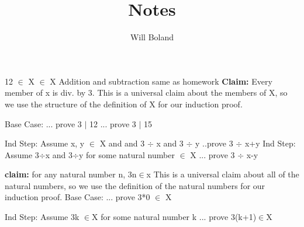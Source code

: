 \documentclass{article}
\begin{document}
\title{Notes}
\author{Will Boland}
\maketitle

12 $\in$ X $\in$ X\newline\newline
Addition and subtraction same as homework\newline\newline
\textbf{Claim:} Every member of x is div. by 3.\newline
This is a universal claim about the members of X, so we use the structure of the definition of X for our induction proof.\newline\newline

Base Case:\newline
... prove 3 $\mid$ 12\newline
... prove 3 $\mid$ 15\newline\newline

Ind Step:\newline
Assume x, y $\in$ X and and 3 $\div$ x and 3 $\div$ y\newline
..prove 3 $\div$ x+y\newline
Ind Step:\newline
Assume 3$\div$x and 3$\div$y for some natural number $\in$ X\newline
... prove 3 $\div$ x-y\newline\newline
 
\textbf{claim:} for any natural number n, 3n$\in$x\newline
This is a universal  claim about all of the natural numbers, so we use the definition of the natural numbers for our induction proof.\newline
Base Case:\newline
... prove 3*0 $\in$ X\newline\newline

Ind Step:\newline
Assume 3k $\in$X for some natural number k\newline
... prove 3(k+1)$\in$X\newline\newline\newline
\end{document}
